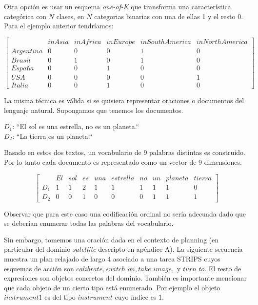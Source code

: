 Otra opción es usar un esquema \emph{one-of-K} que
transforma una característica categórica con $N$ clases, en $N$ categorias
binarias con una de ellas 1 y el resto 0. Para el ejemplo anterior tendríamos:

\begin{equation*}
\begin{bmatrix}
    & inAsia & inAfrica & inEurope & inSouthAmerica & inNorthAmerica \\
    Argentina & 0 & 0 & 0 & 1 & 0 \\
    Brasil & 0 & 1 & 0 & 1 & 0 \\
    España & 0 & 0 & 1 & 0 & 0 \\
    USA & 0 & 0 & 0 & 0 & 1 \\
    Italia & 0 & 0 & 1 & 0 & 0
\end{bmatrix}
\end{equation*}

La misma técnica es válida si se quisiera representar oraciones o documentos del
lenguaje natural. Supongamos que tenemos los documentos.

\begin{center}
    $D_1$: ``El sol es una estrella, no es un planeta.`` \\
    $D_2$: ``La tierra es un planeta.``    
\end{center}

Basado en  estos dos textos, un vocabulario de 9 palabras distintas es
construido. Por lo tanto cada documento es representado como un vector de 9
dimensiones.

\begin{equation*}
    \begin{bmatrix}
        & El & sol & es & una & estrella & no & un & planeta & tierra \\
        D_1 & 1 & 1 & 2 & 1 & 1 & 1 & 1 & 1 & 0  \\
        D_2 & 0 & 0 & 1 & 0 & 0 & 0 & 1 & 1 & 1 
    \end{bmatrix}
\end{equation*}

Observar que para este caso una codificación ordinal no sería adecuada dado que
se deberían enumerar todas las palabras del vocabulario.

Sin embargo, tomemos una oración dada en el contexto de planning (en particular
del dominio \emph{satellite} descripto en apéndice A). La siguiente secuencia
muestra un plan relajado de largo 4 asociado a una tarea STRIPS cuyos esquemas
de acción son $calibrate, switch\_on, take\_image,$ y $turn\_to$. El resto de
expresiones son objetos concretos del dominio. También es importante mencionar
que cada objeto de un cierto tipo está enumerado. Por ejemplo el objeto
$instrument1$ es del tipo $instrument$ cuyo índice es $1$. 


